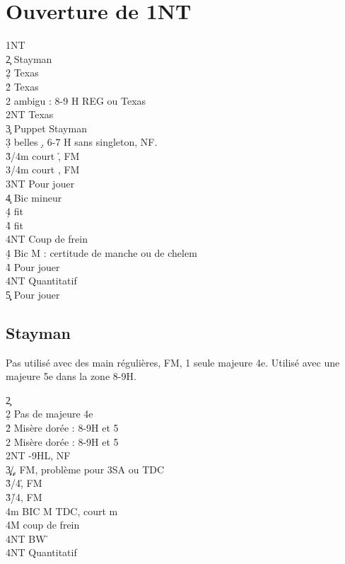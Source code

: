 \documentclass[a4paper]{article}
\begin{document}
\section{Ouverture de 1NT}

\begin{bidtable}
1NT\+\\
2\c \> Stayman\\
2\d \> Texas \h \\
2\h \> Texas \s \\
2\s \> ambigu : 8-9 H REG ou Texas \c \\
2NT \> Texas \d \\
3\c \> Puppet Stayman\\
3\d {} belles \d , 6-7 H sans singleton, NF.\\
3\h {}/4m court \h , FM\\
3\s {}/4m court \s , FM\\
3NT \> Pour jouer\\
4\c \> Bic mineur\+\\
4\d \> fit \d \\
4\h\s \> fit \c \\
4NT \> Coup de frein\-\\
4\d \> Bic M : certitude de manche ou de chelem\\
4\h\s \> Pour jouer\\
4NT \> Quantitatif\\
5\c\d \> Pour jouer\-
\end{bidtable}

\subsection{Stayman}

Pas utilisé avec des main régulières, FM, 1 seule majeure 4e.
Utilisé avec une majeure 5e dans la zone 8-9H.

\begin{bidtable}
2\c\+\\
2\d \> Pas de majeure 4e\+\\
2\h \> Misère dorée : 8-9H et 5\h \\
2\s \> Misère dorée : 8-9H et 5\s \\
2NT -9HL, NF\\
3\c\d {}\c /\d , FM, problème pour 3SA ou TDC\\
3\h {}\s /4\h , FM\\
3\h {}\h /4\s , FM\\
4m \> BIC M TDC, court m\+\\
4M \> coup de frein\\
4NT \> BW \h \-\\
4NT \> Quantitatif\-\-
\end{bidtable}
\end{document}
